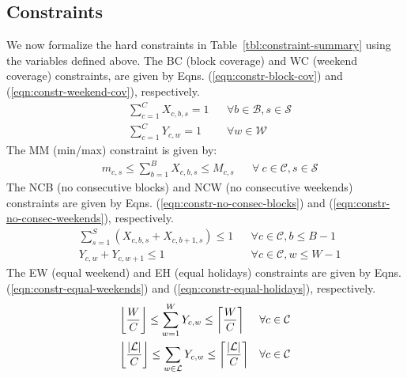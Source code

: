 \subsection{Constraints}\label{sec:meth-constraints}
We now formalize the hard constraints in Table~\ref{tbl:constraint-summary}
using the variables defined above. 
The BC (block coverage) and WC (weekend coverage) constraints, 
are given by Eqns. (\ref{eqn:constr-block-cov}) and (\ref{eqn:constr-weekend-cov}), respectively. 
\begin{align}
&\sum_{c=1}^{C} X_{c, b, s} = 1 &&\forall b\in \mathcal{B}, s \in \mathcal{S} \label{eqn:constr-block-cov} \\
&\sum_{c=1}^{C} Y_{c, w} = 1 &&\forall w\in \mathcal{W} \label{eqn:constr-weekend-cov}
\end{align}
The MM (min/max) constraint is given by:
\begin{align}
&m_{c, s} \leq \sum_{b=1}^{B} X_{c, b, s} \leq M_{c, s} &&\forall\
c\in\mathcal{C}, s\in\mathcal{S} \label{eqn:constr-min-max}
\end{align}
The NCB (no consecutive blocks) and NCW (no consecutive weekends) constraints are 
given by Eqns. (\ref{eqn:constr-no-consec-blocks}) and (\ref{eqn:constr-no-consec-weekends}), respectively.
\begin{align}
&\sum_{s=1}^S \left(X_{c, b, s} + X_{c, b + 1, s}\right) \leq 1 &&\forall c\in\mathcal{C}, b \leq B - 1 \label{eqn:constr-no-consec-blocks} \\
&Y_{c, w} + Y_{c, w + 1} \leq 1 &&\forall c\in\mathcal{C}, w \leq W - 1 \label{eqn:constr-no-consec-weekends}
\end{align}
The EW (equal weekend) and EH (equal holidays) constraints are given by Eqns. (\ref{eqn:constr-equal-weekends})
and (\ref{eqn:constr-equal-holidays}), respectively.
\begin{align}
&\floor*{\frac{W}{C}} \leq \sum_{w=1}^W Y_{c, w} \leq \ceil*{\frac{W}{C}}
&&\forall c\in\mathcal{C} \label{eqn:constr-equal-weekends} \\
&\floor*{\frac{\abs{\mathcal{L}}}{C}} \leq \sum_{w\in\mathcal{L}} Y_{c, w} \leq
\ceil*{\frac{\abs{\mathcal{L}}}{C}} &&\forall c\in\mathcal{C}
\label{eqn:constr-equal-holidays}
\end{align}



